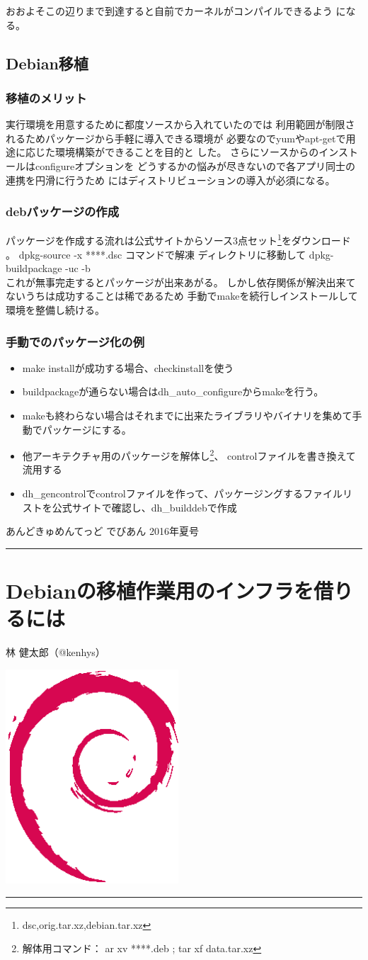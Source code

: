 \documentclass[mingoth,a4paper]{jsarticle}
\renewcommand{\dancersection}[2]{%
\newpage
あんどきゅめんてっど でびあん 2016年夏号
%
\vspace{0.1mm}\\
{\color{dancerdarkblue}\rule{\hsize}{2mm}}

%
%
\begin{minipage}[t]{0.6\hsize}
\color{dancerdarkblue}
\vspace{1cm}
\section{#1}
\hfill{}#2\\
\end{minipage}
\begin{minipage}[t]{0.4\hsize}
\vspace{-2cm}
\hfill{}\includegraphics[height=8cm]{image200502/openlogo-nd.eps}\\
\vspace{-5cm}
\end{minipage}
%
{\color{dancerlightblue}\rule{0.66\hsize}{2mm}}
%
\vspace{2cm}
}
\begin{document}
おおよそこの辺りまで到達すると自前でカーネルがコンパイルできるよう
になる。 
\subsection{Debian移植}
\subsubsection{移植のメリット}
実行環境を用意するために都度ソースから入れていたのでは
利用範囲が制限されるためパッケージから手軽に導入できる環境が
必要なのでyumやapt-getで用途に応じた環境構築ができることを目的と
した。
さらにソースからのインストールはconfigureオプションを
どうするかの悩みが尽きないので各アプリ同士の連携を円滑に行うため
にはディストリビューションの導入が必須になる。 
\subsubsection{debパッケージの作成}
パッケージを作成する流れは公式サイトからソース3点セット\footnote{dsc,orig.tar.xz,debian.tar.xz}をダウンロード 。 
dpkg-source -x ****.dsc コマンドで解凍 ディレクトリに移動して dpkg-buildpackage -uc -b 
\\
これが無事完走するとパッケージが出来あがる。
しかし依存関係が解決出来てないうちは成功することは稀であるため
手動でmakeを続行しインストールして環境を整備し続ける。 
\subsubsection{手動でのパッケージ化の例}
\begin{itemize}
\item make installが成功する場合、checkinstallを使う
\item buildpackageが通らない場合はdh\_auto\_configureからmakeを行う。 
\item makeも終わらない場合はそれまでに出来たライブラリやバイナリを集めて手動でパッケージにする。
\item 他アーキテクチャ用のパッケージを解体し\footnote{解体用コマンド： ar xv ****.deb ; tar xf data.tar.xz }、
controlファイルを書き換えて流用する
\item dh\_gencontrolでcontrolファイルを作って、パッケージングするファイルリストを公式サイトで確認し、dh\_builddebで作成
\end{itemize}

\dancersection{Debianの移植作業用のインフラを借りるには}{林 健太郎（@kenhys）}
\end{document}

